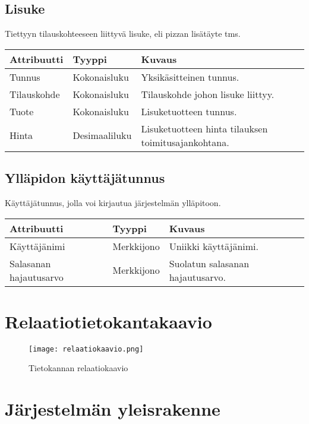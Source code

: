\documentclass[a4paper, 12pt, finnish]{article}
\begin{document}
\subsection*{Lisuke}
Tiettyyn tilauskohteeseen liittyvä lisuke, eli pizzan lisätäyte tms.

\vspace{0.5cm}\hspace{-1cm}
\begin{tabular}{l l p{7cm}}
\textbf{Attribuutti} & \textbf{Tyyppi} & \textbf{Kuvaus} \\
\hline
Tunnus & Kokonaisluku & Yksikäsitteinen tunnus. \\
Tilauskohde & Kokonaisluku & Tilauskohde johon lisuke liittyy. \\
Tuote & Kokonaisluku & Lisuketuotteen tunnus. \\
Hinta & Desimaaliluku & Lisuketuotteen hinta tilauksen toimitusajankohtana. \\
\end{tabular}

\subsection*{Ylläpidon käyttäjätunnus}
Käyttäjätunnus, jolla voi kirjautua järjestelmän ylläpitoon.

\vspace{0.5cm}\hspace{-1cm}
\begin{tabular}{l l p{7cm}}
\textbf{Attribuutti} & \textbf{Tyyppi} & \textbf{Kuvaus} \\
\hline
Käyttäjänimi & Merkkijono & Uniikki käyttäjänimi. \\
Salasanan hajautusarvo & Merkkijono & Suolatun salasanan hajautusarvo. \\
\end{tabular}

\section{Relaatiotietokantakaavio}

\begin{figure}[H]
	\begin{center}
	\caption{Tietokannan relaatiokaavio}
	\texttt{[image: relaatiokaavio.png]}
	\end{center}
\end{figure}

\section{Järjestelmän yleisrakenne}
\end{document}

